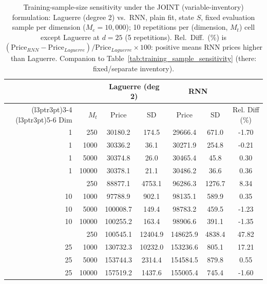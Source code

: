 \begin{table}

\caption{\label{tab:e1_joint_sensitivity}Training-sample-size sensitivity under the JOINT (variable-inventory) formulation: Laguerre (degree 2) vs.\ RNN, plain fit, state $S$, fixed evaluation sample per dimension ($M_e=10{,}000$); 10 repetitions per (dimension, $M_t$) cell except Laguerre at $d=25$ (5 repetitions). Rel.\ Diff.\ (\%) is $(\text{Price}_{RNN} - \text{Price}_{Laguerre})/\text{Price}_{Laguerre} \times 100$: positive means RNN prices higher than Laguerre. Companion to Table~\ref{tab:training_sample_sensitivity} (there: fixed/separate inventory).}
\footnotesize
\setlength{\tabcolsep}{4pt}
\centering
\begin{tabular}[t]{rrccccc}
\toprule
\multicolumn{2}{c}{ } & \multicolumn{2}{c}{Laguerre (deg 2)} & \multicolumn{2}{c}{RNN} & \multicolumn{1}{c}{ } \\
\cmidrule(l{3pt}r{3pt}){3-4} \cmidrule(l{3pt}r{3pt}){5-6}
Dim & $M_t$ & Price & SD & Price & SD & Rel. Diff (\%)\\
\midrule
1 & 250 & 30180.2 & 174.5 & 29666.4 & 671.0 & -1.70\\
1 & 1000 & 30336.2 & 36.1 & 30271.9 & 254.8 & -0.21\\
1 & 5000 & 30374.8 & 26.0 & 30465.4 & 45.8 & 0.30\\
1 & 10000 & 30378.1 & 21.1 & 30486.2 & 36.6 & 0.36\\
\addlinespace
10 & 250 & 88877.1 & 4753.1 & 96286.3 & 1276.7 & 8.34\\
10 & 1000 & 97788.9 & 902.1 & 98135.1 & 589.9 & 0.35\\
10 & 5000 & 100008.7 & 149.4 & 98783.2 & 459.5 & -1.23\\
10 & 10000 & 100255.2 & 163.4 & 98906.6 & 391.1 & -1.35\\
\addlinespace
25 & 250 & 100545.1 & 12404.9 & 148625.9 & 4838.4 & 47.82\\
25 & 1000 & 130732.3 & 10232.0 & 153236.6 & 805.1 & 17.21\\
25 & 5000 & 153744.3 & 2314.4 & 154584.5 & 879.8 & 0.55\\
25 & 10000 & 157519.2 & 1437.6 & 155005.4 & 745.4 & -1.60\\
\bottomrule
\end{tabular}
\end{table}
